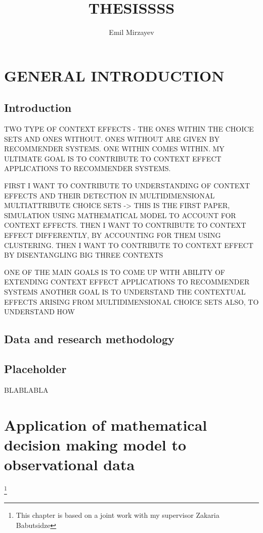 \documentclass[a4paper,12pt]{article}
\title{{\bf \Large THESISSSS}
}
\author{Emil Mirzayev}
\begin{document}
\maketitle

\section{GENERAL INTRODUCTION}

\subsection{Introduction}
TWO TYPE OF CONTEXT EFFECTS - THE ONES WITHIN THE CHOICE SETS AND ONES WITHOUT. ONES WITHOUT ARE GIVEN BY RECOMMENDER SYSTEMS. ONE WITHIN COMES WITHIN. MY ULTIMATE GOAL IS TO CONTRIBUTE TO CONTEXT EFFECT APPLICATIONS TO RECOMMENDER SYSTEMS.

FIRST I WANT TO CONTRIBUTE TO UNDERSTANDING OF CONTEXT EFFECTS AND THEIR DETECTION IN MULTIDIMENSIONAL MULTIATTRIBUTE CHOICE SETS -> THIS IS THE FIRST PAPER, SIMULATION USING MATHEMATICAL MODEL TO ACCOUNT FOR CONTEXT EFFECTS.
THEN I WANT TO CONTRIBUTE TO CONTEXT EFFECT DIFFERENTLY, BY ACCOUNTING FOR THEM USING CLUSTERING.
THEN I WANT TO CONTRIBUTE TO CONTEXT EFFECT BY DISENTANGLING BIG THREE CONTEXTS 

ONE OF THE MAIN GOALS IS TO COME UP WITH ABILITY OF EXTENDING CONTEXT EFFECT APPLICATIONS TO RECOMMENDER SYSTEMS
ANOTHER GOAL IS TO UNDERSTAND THE CONTEXTUAL EFFECTS ARISING FROM MULTIDIMENSIONAL CHOICE SETS
ALSO, TO UNDERSTAND HOW 

\subsection{Data and research methodology}
\subsection{Placeholder}

BLABLABLA

\newpage

\section{Application of mathematical decision making model to observational data} \footnote{This chapter is based on a joint work with my supervisor  Zakaria Babutsidze}
\end{document}
